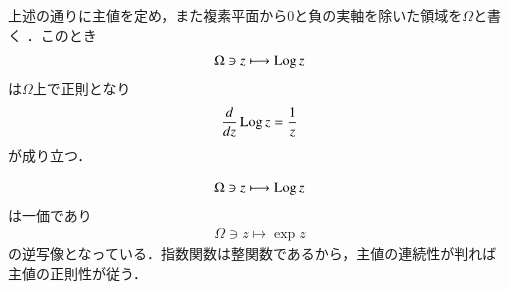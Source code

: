 		\begin{screen}
			\begin{thm}[対数の主値の正則性]
				上述の通りに主値を定め，また複素平面から$0$と負の実軸を除いた領域を$\Omega$と書く\footnotemark
				．このとき
				\begin{align}
					\Omega \ni z \longmapsto \operatorname{Log} z
				\end{align}
				は$\Omega$上で正則となり
				\begin{align}
					\frac{d}{dz} \operatorname{Log} z = \frac{1}{z}
				\end{align}
				が成り立つ．
			\end{thm}
		\end{screen}
		\begin{prf}
			\begin{align}
				\Omega \ni z \longmapsto \operatorname{Log} z
			\end{align}
			は一価であり
			\begin{align}
				\Omega \ni z \longmapsto \exp{z}
			\end{align}
			の逆写像となっている．指数関数は整関数であるから，主値の連続性が判れば
			主値の正則性が従う．
		\end{prf}


